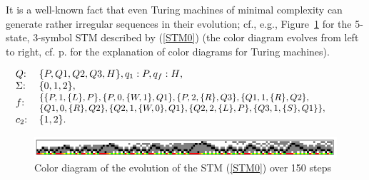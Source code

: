 \documentclass[%
  manuscript=article,   %
  year=2024,
  volume=77,
  doi=10.59203/zfn.77.694,
]{zfn}
\begin{document}
It is a well-known fact that even Turing machines of minimal complexity can generate rather irregular sequences in their evolution; cf., e.g., Figure~\ref{messy} for the 5-state, 3-symbol STM described by (\ref{STM0}) (the color diagram evolves from left to right, cf. p. \pageref{colordia} for the explanation of color diagrams for Turing machines).

\begin{table}[!ht]
\begin{eqnarray}
\hspace{-0.5cm}& \begin{tabular}{ll}
$Q$: & $\{P,Q1,Q2,Q3,H\}, q_{1}:P, q_{f}:H$,\\
$\Sigma$: & $\{0,1,2\}$,\\
$f$: & \hspace{-0.2cm}\begin{small}\begin{tabular}{l}$\{\{P,1,\{L\}, P\},\{P,0,\{W,1\},Q1\},\{P,2,\{R\},Q3\},\{Q1,1,\{R\},Q2\},$\\
$\{Q1,0,\{R\},Q2\},\{Q2,1,\{W,0\},Q1\},\{Q2,2,\{L\},P\},\{Q3,1,\{S\},Q1\}\}$,\end{tabular}\end{small}\\
$c_{2}$: & $\{1, 2\}$.
\end{tabular} & \label{STM0}
\end{eqnarray}
\caption{A 5-state, 3-symbol STM inducing the irregular color diagram in Fig.~\ref{messy}}
\end{table}

\begin{figure}[!ht]
    \centering
    \includegraphics[width=12.5cm]{ART_Lampert/messy.png}
\caption{Color diagram of the evolution of the STM (\ref{STM0}) over 150 steps}
    \label{messy}
\end{figure}
\end{document}
